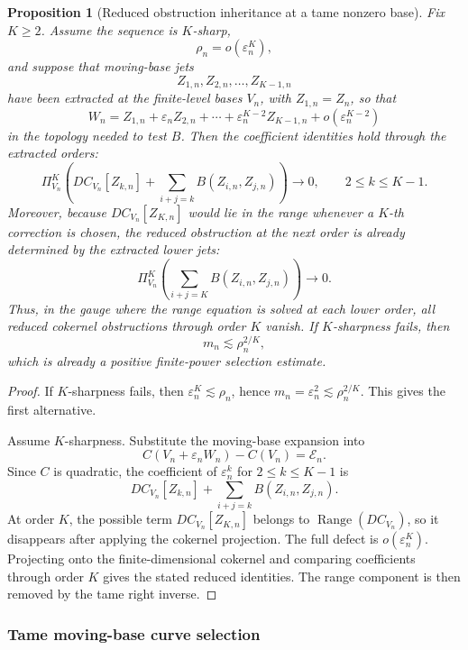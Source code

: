 \documentclass[11pt]{article}
\numberwithin{equation}{section}
\theoremstyle{plain}
\newtheorem{proposition}{Proposition}[section]
\theoremstyle{definition}
\theoremstyle{remark}
\DeclareMathOperator{\Range}{Range}
\newcommand{\calE}{\mathcal E}
\begin{document}
\begin{proposition}[Reduced obstruction inheritance at a tame nonzero base]
\label{pIII:prop:nonzero-reduced-obstruction-inheritance}
Fix \(K\ge2\).  Assume the sequence is \(K\)-sharp,
\[
        \rho_n=o(\varepsilon_n^K),
\]
and suppose that moving-base jets
\[
        Z_{1,n},Z_{2,n},\ldots,Z_{K-1,n}
\]
have been extracted at the finite-level bases \(V_n\), with \(Z_{1,n}=Z_n\), so that
\[
        W_n=Z_{1,n}+\varepsilon_nZ_{2,n}+\cdots+
        \varepsilon_n^{K-2}Z_{K-1,n}+o(\varepsilon_n^{K-2})
\]
in the topology needed to test \(B\).  Then the coefficient identities hold through the extracted orders:
\[
        \Pi_{V_n}^K
        \left(
        DC_{V_n}[Z_{k,n}]
        +
        \sum_{i+j=k}B(Z_{i,n},Z_{j,n})
        \right)
        \to0,
        \qquad 2\le k\le K-1.
\]
Moreover, because \(DC_{V_n}[Z_{K,n}]\) would lie in the range whenever a \(K\)-th correction is chosen,
the reduced obstruction at the next order is already determined by the extracted lower jets:
\[
        \Pi_{V_n}^K
        \left(
        \sum_{i+j=K}B(Z_{i,n},Z_{j,n})
        \right)
        \to0.
\]
Thus, in the gauge where the range equation is solved at each lower order, all reduced cokernel
obstructions through order \(K\) vanish.
If \(K\)-sharpness fails, then
\[
        m_n\lesssim \rho_n^{2/K},
\]
which is already a positive finite-power selection estimate.
\end{proposition}

\begin{proof}
If \(K\)-sharpness fails, then \(\varepsilon_n^K\lesssim\rho_n\), hence
\(m_n=\varepsilon_n^2\lesssim\rho_n^{2/K}\).  This gives the first alternative.

Assume \(K\)-sharpness.  Substitute the moving-base expansion into
\[
        C(V_n+\varepsilon_nW_n)-C(V_n)=\calE_n.
\]
Since \(C\) is quadratic, the coefficient of \(\varepsilon_n^k\) for \(2\le k\le K-1\) is
\[
        DC_{V_n}[Z_{k,n}]+
        \sum_{i+j=k}B(Z_{i,n},Z_{j,n}).
\]
At order \(K\), the possible term \(DC_{V_n}[Z_{K,n}]\) belongs to
\(\Range(DC_{V_n})\), so it disappears after applying the cokernel projection.  The full defect is
\(o(\varepsilon_n^K)\).  Projecting onto the finite-dimensional cokernel and comparing coefficients
through order \(K\) gives the stated reduced identities.  The range component is then removed by the
tame right inverse.
\end{proof}

\subsubsection{Tame moving-base curve selection}
\end{document}
